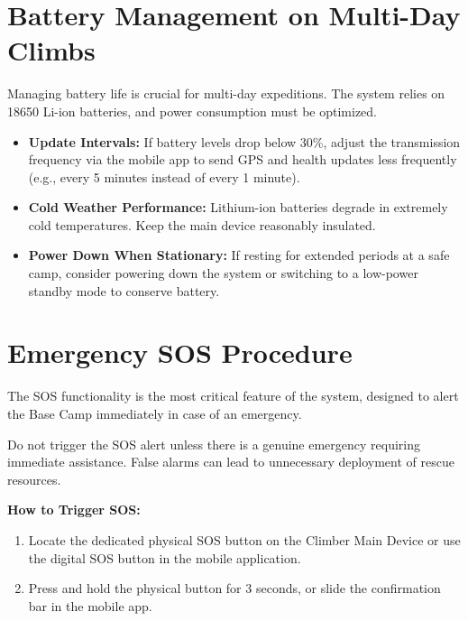 \section{Battery Management on Multi-Day Climbs}
\label{sec:battery-management}

Managing battery life is crucial for multi-day expeditions. The system relies on 18650 Li-ion batteries, and power consumption must be optimized.

\begin{itemize}
    \item \textbf{Update Intervals:} If battery levels drop below 30\%, adjust the transmission frequency via the mobile app to send GPS and health updates less frequently (e.g., every 5 minutes instead of every 1 minute).
    \item \textbf{Cold Weather Performance:} Lithium-ion batteries degrade in extremely cold temperatures. Keep the main device reasonably insulated.
    \item \textbf{Power Down When Stationary:} If resting for extended periods at a safe camp, consider powering down the system or switching to a low-power standby mode to conserve battery.
\end{itemize}

\section{Emergency SOS Procedure}
\label{sec:emergency-sos}

The SOS functionality is the most critical feature of the system, designed to alert the Base Camp immediately in case of an emergency.

\begin{cautionbox}
Do not trigger the SOS alert unless there is a genuine emergency requiring immediate assistance. False alarms can lead to unnecessary deployment of rescue resources.
\end{cautionbox}

\textbf{How to Trigger SOS:}
\begin{enumerate}
    \item Locate the dedicated physical SOS button on the Climber Main Device or use the digital SOS button in the mobile application.
    \item Press and hold the physical button for 3 seconds, or slide the confirmation bar in the mobile app.
\end{enumerate}


